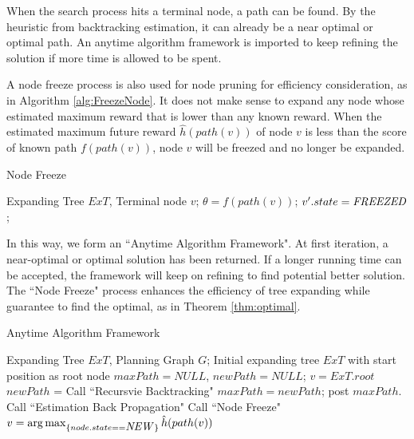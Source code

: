 \documentclass[12pt]{article}
\begin{document}
When the search process hits a terminal node, a path can be found. By the heuristic from backtracking estimation, it can already be a near optimal or optimal path. An anytime algorithm framework is imported to keep refining the solution if more time is allowed to be spent.

A node freeze process is also used for node pruning for efficiency consideration, as in Algorithm \ref{alg:FreezeNode}. It does not make sense to expand any node whose estimated maximum reward that is lower than any known reward. When the estimated maximum future reward $ \hat{h}(path(v)) $ of node $ v $ is less than the score of known path $ f(path(v)) $, node $ v $ will be freezed and no longer be expanded.

\begin{algorithm}
\caption{Node Freeze}
\label{alg:FreezeNode}
\begin{algorithmic}
\REQUIRE 
Expanding Tree $ ExT $, Terminal node $ v $;
\STATE $ \theta = f(path(v)) $; 
\STATE $ v'.state = \mbox{\emph{FREEZED}} $; 
\ENDIF
\ENDFOR
\end{algorithmic}
\end{algorithm}

In this way, we form an ``Anytime Algorithm Framework". At first iteration, a near-optimal or optimal solution has been returned. If a longer running time can be accepted, the framework will keep on refining to find potential better solution. The ``Node Freeze" process enhances the efficiency of tree expanding while guarantee to find the optimal, as in Theorem \ref{thm:optimal}.

\begin{algorithm}
\caption{Anytime Algorithm Framework}
\label{alg:Anytime}
\begin{algorithmic}
\REQUIRE 
Expanding Tree $ ExT $, Planning Graph $ G $;
\STATE Initial expanding tree $ ExT $ with start position as root node
\STATE $ maxPath = NULL $, $ newPath = NULL $;
\STATE $ v = ExT.root $
\STATE $ newPath $ = Call ``Recursvie Backtracking"
\STATE $ maxPath = newPath $;
\STATE post $ maxPath $.
\ENDIF
\STATE Call ``Estimation Back Propagation"
\STATE Call ``Node Freeze"
\STATE $ v = \arg \max_{ \{ node.state == \mbox{\emph{NEW}} \} } \hat{h}(path(v)) $
\ENDWHILE 
\end{algorithmic}
\end{algorithm}
\end{document}

